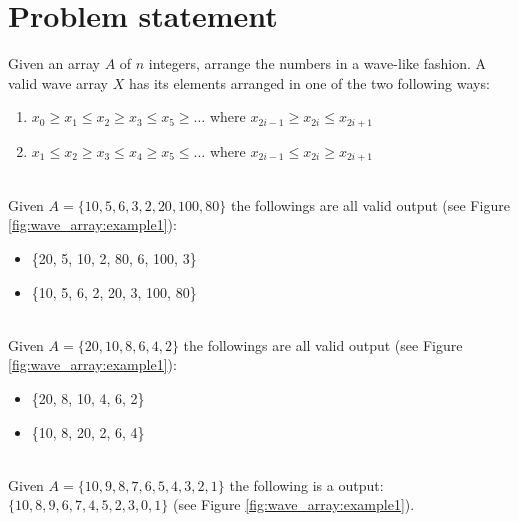 \section{Problem statement}
\begin{exercise}
\label{ex:wave_array:statement}
Given an array $A$ of $n$ integers, arrange the numbers in a wave-like fashion. A valid wave array $X$ has its elements arranged in one of the two following ways:
	\begin{enumerate}
		\item  $x_0 \geq x_1 \leq x_2 \geq x_3 \leq  x_5 \geq \ldots$ where $x_{2i-1} \geq x_{2i} \leq x_{2i+1}$
		\item  $x_1 \leq x_2 \geq x_3 \leq x_4 \geq x_5 \leq \ldots$ where $x_{2i-1} \leq x_{2i} \geq x_{2i+1}$
	\end{enumerate}


	\begin{example}
		\hfill \\
		\label{ex:wave_array:example1}
		Given $A= \{10, 5, 6, 3, 2, 20, 100, 80\}$ the followings are all valid output (see Figure \ref{fig:wave_array:example1}):
		\begin{itemize}
			\item  \{20, 5, 10, 2, 80, 6, 100, 3\}
			\item  \{10, 5, 6, 2, 20, 3, 100, 80\}
		\end{itemize}
	\end{example}

	\begin{example}
		\hfill \\
		\label{ex:wave_array:example2}
		Given $A= \{20, 10, 8, 6, 4, 2\}$ the followings are all valid output (see Figure \ref{fig:wave_array:example1}):
		\begin{itemize}
			\item \{20, 8, 10, 4, 6, 2\}
			\item  \{10, 8, 20, 2, 6, 4\}
		\end{itemize}
		
	\end{example}

	\begin{example}
		\hfill \\
		\label{ex:wave_array:example3}
		Given $A= \{10,9,8,7,6,5,4,3,2,1\}$ the following is a output: $\{10, 8, 9, 6, 7, 4, 5, 2, 3, 0,
		1 \}$ (see Figure \ref{fig:wave_array:example1}).
		
	\end{example}
\end{exercise}


